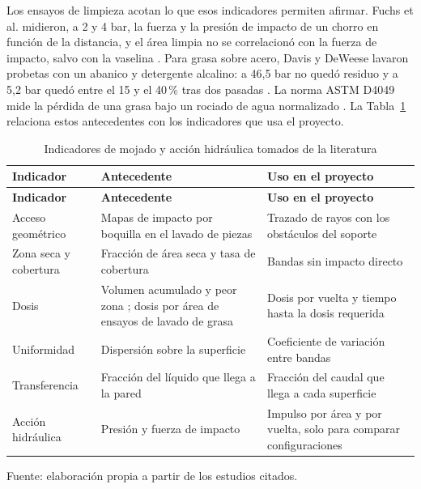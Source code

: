 Los ensayos de limpieza acotan lo que esos indicadores permiten afirmar. Fuchs et al. midieron, a 2 y 4 bar, la fuerza y la presión de impacto de un chorro en función de la distancia, y el área limpia no se correlacionó con la fuerza de impacto, salvo con la vaselina \cite{fuchs2019}. Para grasa sobre acero, Davis y DeWeese lavaron probetas con un abanico y detergente alcalino: a 46,5 bar no quedó residuo y a 5,2 bar quedó entre el 15 y el 40\,\% tras dos pasadas \cite{davis1995}. La norma ASTM D4049 mide la pérdida de una grasa bajo un rociado de agua normalizado \cite{astmd4049}. La Tabla~\ref{tab:indicadores-literatura} relaciona estos antecedentes con los indicadores que usa el proyecto.

\begingroup
\small\singlespacing
\setlength{\parskip}{0pt}
\setlength{\tabcolsep}{4pt}
\renewcommand{\arraystretch}{1.1}
\begin{longtable}{@{}>{\raggedright\arraybackslash}p{3.3cm}>{\raggedright\arraybackslash}p{4.6cm}>{\raggedright\arraybackslash}p{\dimexpr\textwidth-7.9cm-4\tabcolsep\relax}@{}}
\caption{Indicadores de mojado y acción hidráulica tomados de la literatura}\label{tab:indicadores-literatura}\\
\toprule
\textbf{Indicador} & \textbf{Antecedente} & \textbf{Uso en el proyecto}\\
\midrule\endfirsthead
\toprule
\textbf{Indicador} & \textbf{Antecedente} & \textbf{Uso en el proyecto}\\
\midrule\endhead
\bottomrule\endlastfoot
Acceso geométrico & Mapas de impacto por boquilla en el lavado de piezas \cite{carlsson2018} & Trazado de rayos con los obstáculos del soporte\\
Zona seca y cobertura & Fracción de área seca y tasa de cobertura \cite{moghimi2025,fei2026} & Bandas sin impacto directo\\
Dosis & Volumen acumulado y peor zona \cite{fei2026}; dosis por área de ensayos de lavado de grasa \cite{davis1995,astmd4049} & Dosis por vuelta y tiempo hasta la dosis requerida\\
Uniformidad & Dispersión sobre la superficie \cite{fang2023} & Coeficiente de variación entre bandas\\
Transferencia & Fracción del líquido que llega a la pared \cite{moghimi2025} & Fracción del caudal que llega a cada superficie\\
Acción hidráulica & Presión y fuerza de impacto \cite{kou2020,fuchs2019} & Impulso por área y por vuelta, solo para comparar configuraciones\\
\end{longtable}
\par\smallskip\footnotesize
Fuente: elaboración propia a partir de los estudios citados.
\endgroup

